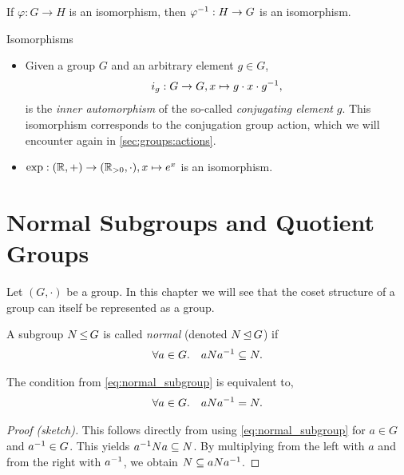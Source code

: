 \begin{rmk}
If $\varphi : G \to H$ is an isomorphism, then $\varphi^{-1} : H \to G$ is an isomorphism.
\end{rmk}

\begin{ex}{Isomorphisms}{}
\begin{itemize}
    \item Given a group $G$ and an arbitrary element $g \in G$, \begin{align}
        i_g : G \to G, x \mapsto g \cdot x \cdot g^{-1},
    \end{align} is the \emph{inner automorphism} of the so-called \emph{conjugating element} $g$. This isomorphism corresponds to the conjugation group action, which we will encounter again in \cref{sec:groups:actions}.
    
    \item $\exp : (\mathbb{R},+) \to (\mathbb{R}_{>0},\cdot), x \mapsto e^x$ is an isomorphism.
\end{itemize}
\end{ex}

\chapter{Normal Subgroups and Quotient Groups}
Let $(G,\cdot)$ be a group. In this chapter we will see that the coset structure of a group can itself be represented as a group.

\begin{defn}
A subgroup $N \operatorname*{\leq} G$ is called \emph{normal} (denoted $N \operatorname*{\trianglelefteq} G$) if \begin{align}
    \forall a \in G.\quad a N a^{-1} \subseteq N. \label{eq:normal_subgroup}
\end{align}
\end{defn}

\begin{rmk}\label{rmk:normal_subgroup}
The condition from \cref{eq:normal_subgroup} is equivalent to, \begin{align}
    \forall a \in G.\quad a N a^{-1} = N.
\end{align}
\end{rmk} \begin{proof}[Proof (sketch)]
This follows directly from using \cref{eq:normal_subgroup} for $a \in G$ and $a^{-1} \in G$. This yields $a^{-1} N a \subseteq N$. By multiplying from the left with $a$ and from the right with $a^{-1}$, we obtain $N \subseteq a N a^{-1}$.
\end{proof}

